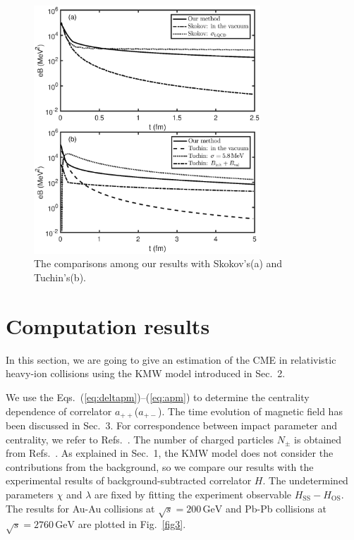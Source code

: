 \documentclass[preprint]{elsarticle}
\begin{document}
\begin{figure}
\centering
\includegraphics[width=8.5cm]{fig2.eps}
\caption{\label{fig2}The comparisons among our results with Skokov's(a) and Tuchin's(b).}
\end{figure}

\section{Computation results}\label{compuResult}
In this section, we are going to give an estimation of the CME in relativistic heavy-ion collisions using the KMW model introduced in Sec.~2.

We use the Eqs.~(\ref{eq:deltapm})--(\ref{eq:apm}) to determine the centrality dependence of correlator $a_{++}$($a_{+-}$). The time evolution of magnetic field has been discussed in Sec.~3. For correspondence between impact parameter and centrality, we refer to Refs.~\cite{Ray:2007av,Abelev:2013qoq}.
The number of charged particles $N_\pm$ is obtained from Refs.~\cite{Ray:2007av,Aamodt:2011cdo}. As explained in Sec.~1, the KMW model does not consider the contributions from the background, so we compare our results with the experimental results of background-subtracted correlator $H$. The undetermined parameters $\chi$ and $\lambda$ are fixed by fitting the experiment observable $H_\text{SS} - H_\text{OS}$. The results for Au-Au collisions at $\sqrt{s} = 200\,\mathrm{GeV}$ and Pb-Pb collisions at $\sqrt{s} = 2760\,\mathrm{GeV}$ are plotted in Fig.~\ref{fig3}.
\end{document}
